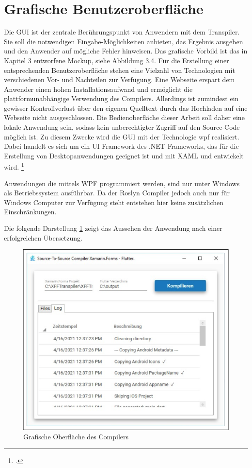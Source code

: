 \section{Grafische Benutzeroberfläche}
Die GUI ist der zentrale Berührungspunkt von Anwendern mit dem Transpiler.  Sie soll die notwendigen Eingabe-Möglichkeiten anbieten, das Ergebnis ausgeben und den Anwender auf mögliche Fehler hinweisen.  Das grafische Vorbild ist das in Kapitel 3 entworfene Mockup, siehe Abbildung 3.4.  Für die Erstellung einer entsprechenden Benutzeroberfläche stehen eine Vielzahl von Technologien mit verschiedenen Vor- und Nachteilen zur Verfügung. Eine Webseite erspart dem Anwender einen hohen Installationsaufwand und ermöglicht die plattformunabhängige Verwendung des Compilers.  Allerdings ist zumindest ein gewisser Kontrollverlust über den eigenen Quelltext durch das  Hochladen auf eine Webseite nicht ausgeschlossen.  Die Bedienoberfläche dieser Arbeit soll daher eine lokale Anwendung sein, sodass kein  unberechtigter Zugriff auf den Source-Code möglich ist.  Zu diesem Zwecke wird die GUI mit der Technologie \ac{wpf}  realisiert.  Dabei handelt es sich um ein UI-Framework des .NET Frameworks, das für die Erstellung von Desktopanwendungen geeignet ist und mit XAML und \Csharp entwickelt wird. \footcite[Vgl.][S. 1f]{Wenger2012} 

Anwendungen die mittels WPF programmiert werden, sind nur unter Windows als Betriebssystem ausführbar.  Da der Roslyn Compiler jedoch auch nur für Windows Computer zur Verfügung steht entstehen hier keine zusätzlichen Einschränkungen. 

Die folgende Darstellung \ref{fig:CompilerUI} zeigt das Aussehen der Anwendung nach einer erfolgreichen Übersetzung.
\newpage
\begin{figure}[!ht]
 \includegraphics[width=\textwidth,keepaspectratio]{Images/Implementation/UiScreenshot.png}
 \caption{Grafische Oberfläche des Compilers}
 \label{fig:CompilerUI}
\end{figure}

